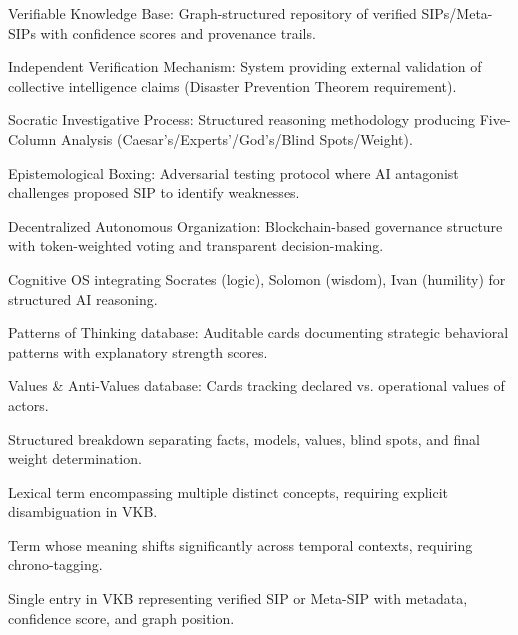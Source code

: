 \documentclass[11pt,a4paper]{article}
\theoremstyle{definition}
\theoremstyle{remark}
\newcommand{\VKB}{\textsc{VKB}}
\newcommand{\IVM}{\textsc{IVM}}
\newcommand{\SIP}{\textsc{SIP}}
\newcommand{\EBP}{\textsc{EBP}}
\newcommand{\DAO}{\textsc{DAO}}
\begin{document}
\begin{description}[leftmargin=4cm,style=nextline]
    \item[\VKB{}] Verifiable Knowledge Base: Graph-structured repository of verified \SIP{}s/Meta-\SIP{}s with confidence scores and provenance trails.
    
    \item[\IVM{}] Independent Verification Mechanism: System providing external validation of collective intelligence claims (Disaster Prevention Theorem requirement).
    
    \item[\SIP{}] Socratic Investigative Process: Structured reasoning methodology producing Five-Column Analysis (Caesar's/Experts'/God's/Blind Spots/Weight).
    
    \item[\EBP{}] Epistemological Boxing: Adversarial testing protocol where AI antagonist challenges proposed \SIP{} to identify weaknesses.
    
    \item[\DAO{}] Decentralized Autonomous Organization: Blockchain-based governance structure with token-weighted voting and transparent decision-making.
    
    \item[Triple Architect] Cognitive OS integrating Socrates (logic), Solomon (wisdom), Ivan (humility) for structured AI reasoning.
    
    \item[PM.txt] Patterns of Thinking database: Auditable cards documenting strategic behavioral patterns with explanatory strength scores.
    
    \item[VP.txt] Values \& Anti-Values database: Cards tracking declared vs. operational values of actors.
    
    \item[Five-Column Analysis] Structured breakdown separating facts, models, values, blind spots, and final weight determination.
    
    \item[Word-Poly] Lexical term encompassing multiple distinct concepts, requiring explicit disambiguation in \VKB{}.
    
    \item[Chrono-Word-Poly] Term whose meaning shifts significantly across temporal contexts, requiring chrono-tagging.
    
    \item[Knowledge Node] Single entry in \VKB{} representing verified \SIP{} or Meta-\SIP{} with metadata, confidence score, and graph position.
    

\end{description}
\end{document}

